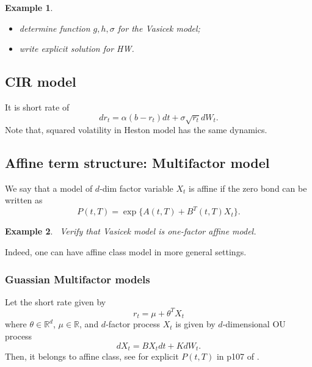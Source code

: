 \documentclass{article}
\newtheorem{example}{Example}
\begin{document}
\begin{example}
\label{exm:hw01}\begin{itemize}
\item determine function $g, h, \sigma$ for the Vasicek model;
\item write explicit solution for HW.
\end{itemize}
\end{example}


\subsection{CIR model}
It is short rate of
$$d r_t = \alpha(b - r_t) dt + \sigma \sqrt{r_t} dW_t.$$
Note that, squared volatility in Heston model has the same dynamics.

\subsection{Affine term structure: Multifactor model}



We say that a model of $d$-dim factor variable $X_{t}$  is affine if the zero bond can be written as
$$P(t, T) = \exp\{A(t, T) + B^{T}(t, T) X_{t}\}.$$

\begin{example}
\label{exm:mf01}\
Verify that Vasicek model is one-factor affine model.
\end{example}

Indeed, one can have affine class model in more general settings.

\subsubsection{Guassian Multifactor models}
Let the short rate given by 
$$r_t = \mu + \theta^T X_t$$
where $\theta\in \mathbb R^d$, $\mu \in\mathbb R$,  
and $d$-factor process $X_t$ is given by $d$-dimensional OU process
$$d X_t =BX_t dt + K dW_t.$$
Then, it belongs to affine class, see for explicit $P(t, T)$ in  p107 of \cite{Cai04}.





%
%

\end{document}
